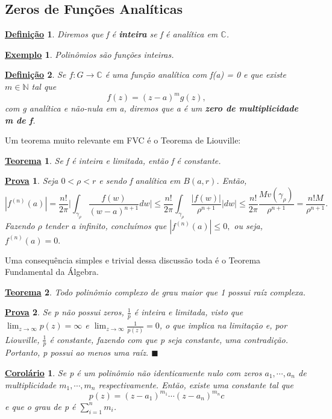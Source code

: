 \documentclass{article}
\newtheorem*{def*}{\underline{Defini\c c\~ao}}
\newtheorem*{theorem*}{\underline{Teorema}}
\newtheorem{example}{\underline{Exemplo}}[section]
\newtheorem*{proof*}{\underline{Prova}}
\newtheorem*{crl*}{\underline{Corol\'ario}}
\renewcommand\qedsymbol{$\blacksquare$}
\begin{document}
  \subsection{Zeros de Fun\c c\~oes Anal\'iticas}
  \begin{def*}
    Diremos que f \'e \textbf{inteira} se f \'e anal\'itica em $\mathbb{C}$.
  \end{def*}
  \begin{example}
    Polin\^omios s\~ao fun\c c\~oes inteiras.
  \end{example}
  \begin{def*}
    Se $f:G\rightarrow \mathbb{C}$ \'e uma fun\c c\~ao anal\'itica com f(a) = 0 e que existe $m\in \mathbb{N}$ tal que 
    $$
    f(z) = (z-a)^{m}g(z),
    $$
    com g anal\'itica e n\~ao-nula em a, diremos que a \'e um \textbf{zero de multiplicidade m de f}.
  \end{def*}
  Um teorema muito relevante em FVC \'e o Teorema de Liouville:
  \begin{theorem*}
    Se f \'e inteira e limitada, ent\~ao f \'e constante.
  \end{theorem*}
  \begin{proof*}
    Seja $0 < \rho < r$ e sendo f anal\'itica em $B(a, r)$. Ent\~ao, 
    $$
    |f^{(n)}(a)| = \frac{n!}{2 \pi}\biggl|\int_{\gamma_{\rho}}^{}\frac{f(w)}{(w-a)^{n+1}}dw\biggr|
    \leq \frac{n!}{2\pi}\int_{\gamma_{\rho}}^{}\frac{|f(w)|}{\rho^{n+1}}|dw| \leq \frac{n!}{2\pi}\frac{Mv(\gamma_{\rho})}{\rho^{n+1}} = \frac{n!M}{\rho^{n+1}}.
    $$
    Fazendo $\rho$ tender a infinito, conclu\'imos que $|f^{(n)}(a)|\leq0,$ ou seja, $f^{(n)}(a) = 0.$
  \end{proof*}
  Uma consequ\^encia simples e trivial dessa discuss\~ao toda \'e o Teorema Fundamental da \'Algebra.
  \begin{theorem*}
    Todo polin\^omio complexo de grau maior que 1 possui ra\'iz complexa. 
  \end{theorem*}
  \begin{proof*}
    Se p n\~ao possui zeros, $\frac{1}{p}$ \'e inteira e limitada, visto que $\lim_{z\to\infty}p(z) = \infty$ e $\lim_{z\to\infty}\frac{1}{p(z)} = 0$, 
    o que implica na limita\c c\~ao e, por Liouville, $\frac{1}{p}$ \'e constante, fazendo com que p seja constante, uma contradi\c c\~ao.
    Portanto, p possui ao menos uma ra\'iz. \qedsymbol
  \end{proof*}
  \begin{crl*}
    Se p \'e um polin\^omio n\~ao identicamente nulo com zeros $a_1, \cdots, a_{n}$ de multiplicidade $m_1, \cdots, m_{n}$ respectivamente. Ent\~ao,
    existe uma constante tal que 
    $$
    p(z) = (z-a_1)^{m_1}\cdots(z-a_{n})^{m_{n}}c
    $$
    e que o grau de p \'e $\sum\limits_{i=1}^{n}m_{i}$.
  \end{crl*}
  \newpage
\end{document}
